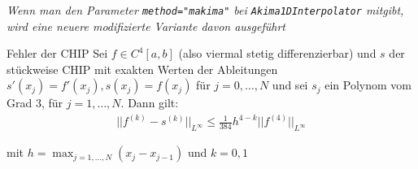 \begin{footnotesize}
    \textit{Wenn man den Parameter \texttt{method="makima"} bei \texttt{Akima1DInterpolator} mitgibt, wird eine neuere modifizierte Variante davon ausgeführt}
\end{footnotesize}

\begin{theorem}[]{Fehler der CHIP}
    Sei $f \in C^4[a, b]$ (also viermal stetig differenzierbar) und $s$ der stückweise CHIP mit exakten Werten der Ableitungen $s'(x_j) = f'(x_j), s(x_j) = f(x_j)$ für $j = 0, \ldots, N$
    und sei $s_j$ ein Polynom vom Grad $3$, für $j = 1, \ldots, N$. Dann gilt:
    \rmvspace
    \begin{align*}
        ||f^{(k)} - s^{(k)}||_{L^\infty} \leq \frac{1}{384} h^{4 - k} ||f^{(4)}||_{L^\infty}
    \end{align*}

    \rmvspace
    mit $h = \max_{j = 1, \ldots, N} (x_j - x_{j - 1})$ und $k = 0, 1$
\end{theorem}
